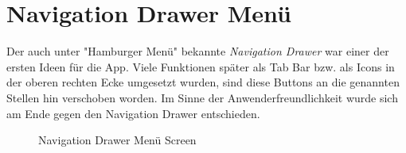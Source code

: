 \documentclass[
    DIV12,
    cleardouble=plain,
    headings=normal,
    pdftex,
    headexclude,footexclude,
    final
]{scrreprt}
\begin{document}
\section{Navigation Drawer Menü}
Der auch unter "Hamburger Menü" bekannte \textit{Navigation Drawer} war einer der ersten Ideen für die App. Viele Funktionen später als Tab Bar bzw. als Icons in der oberen rechten Ecke umgesetzt wurden, sind diese Buttons an die genannten Stellen hin verschoben worden. Im Sinne der Anwenderfreundlichkeit wurde sich am Ende gegen den Navigation Drawer entschieden.
\begin{figure}[H]
	\centering
	\caption{Navigation Drawer Menü Screen}
	\label{main_burger}
\end{figure}
\end{document}
